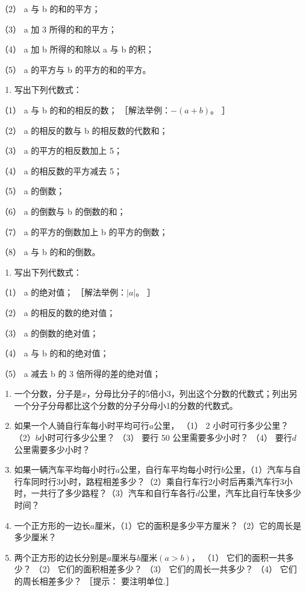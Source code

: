 （2） a 与 b 的和的平方；

（3） a 加 3 所得的和的平方；

（4） a 加 b 所得的和除以 a 与 b 的积；

（5） a 的平方与 b 的平方的和的平方。

\begin{enumerate}[start=4]
\item
  写出下列代数式：
\end{enumerate}

（1） a 与 b 的和的相反的数； ［解法举例：\(-(a+b)\)。 ］

（2） a 的相反的数与 b 的相反数的代数和；

（3） a 的平方的相反数加上 5；

（4） a 的相反数的平方减去 5；

（5） a 的倒数；

（6） a 的倒数与 b 的倒数的和；

（7） a 的平方的倒数加上 b 的平方的倒数；

（8） a 与 b 的和的倒数。

\begin{enumerate}[start=5]
\item
  写出下列代数式：
\end{enumerate}

（1） a 的绝对值； ［解法举例：\(|a|\)。 ］

（2） a 的相反的数的绝对值；

（3） a 的倒数的绝对值；

（4） a 与 b 的和的绝对值；

（5） a 减去 b 的 3 倍所得的差的绝对值；

\begin{enumerate}[start=6]
\item
  一个分数，分子是\(x\)，分母比分子的5倍小3，列出这个分数的代数式；列出另一个分子分母都比这个分数的分子分母小1的分数的代数式。
\item
  如果一个人骑自行车每小时平均可行\(a\)公里， （1） 2 小时可行多少公里？
  （2）\(b\)小时可行多少公里？ （3） 要行 50 公里需要多少小时？ （4）
  要行\(d\)公里需要多少小时？
\item
  如果一辆汽车平均每小时行\(a\)公里，自行车平均每小时行\(b\)公里，（1）汽车与自行车同时行3小时，路程相差多少？（2）乘自行车行2小时后再乘汽车行3小时，一共行了多少路程？（3）汽车和自行车各行\(d\)公里，汽车比自行车快多少时间？
\item
  一个正方形的一边长\(a\)厘米，（1）它的面积是多少平方厘米？（2）它的周长是多少厘米？
\item
  两个正方形的边长分别是\(a\)厘米与\(b\)厘米\((a > b)\)， （1）
  它们的面积一共多少？ （2） 它们的面积相差多少？ （3）
  它们的周长一共多少？ （4） 它们的周长相差多少？ ［提示： 要注明单位.］
\end{enumerate}


